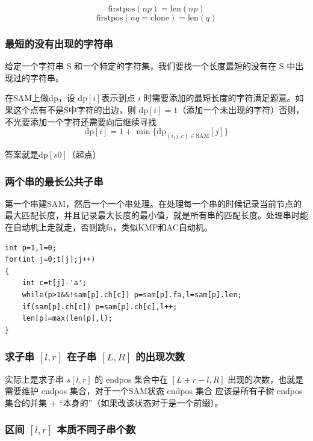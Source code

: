 $$
\text{firstpos}(np)=\text{len}(np)
$$
$$
\text{firstpos}(nq=\text{clone})=\text{len}(q)
$$
\subsubsection{最短的没有出现的字符串}

\begin{tcolorbox}
给定一个字符串 S 和一个特定的字符集，我们要找一个长度最短的没有在 S 中出现过的字符串。
\end{tcolorbox}

\par \noindent 在SAM上做dp，设 $\text{dp}[i]$表示到点 $i$ 时需要添加的最短长度的字符满足题意。如果这个点有不是S中字符的出边，则 $\text{dp}[i]=1$（添加一个未出现的字符）否则，不光要添加一个字符还需要向后继续寻找
$$
\text{dp}[i]=1+\min\{\text{dp}_{(i,j,c)\in\text{SAM}}[j]\}
$$

\par \noindent 答案就是$\text{dp}[s0]$（起点）

\subsubsection{两个串的最长公共子串}
\par \noindent 第一个串建SAM，然后一个一个串处理。在处理每一个串的时候记录当前节点的最大匹配长度，并且记录最大长度的最小值，就是所有串的匹配长度。处理串时能在自动机上走就走，否则跳fa，类似KMP和AC自动机。

\begin{verbatim}
int p=1,l=0;
for(int j=0;t[j];j++)
{
    int c=t[j]-'a';
    while(p>1&&!sam[p].ch[c]) p=sam[p].fa,l=sam[p].len;
    if(sam[p].ch[c]) p=sam[p].ch[c],l++;
    len[p]=max(len[p],l);
}
\end{verbatim}
\subsubsection{求子串 $[l, r]$ 在子串 $[L, R]$ 的出现次数}
\par \noindent 实际上是求子串 $s[l,r]$ 的 endpos 集合中在 $[L+r-l,R]$ 出现的次数，也就是需要维护 endpos 集合，对于一个SAM状态 endpos 集合 应该是所有子树 endpos 集合的并集 + “本身的”（如果改该状态对于是一个前缀）。
\subsubsection{区间 $[l, r]$ 本质不同子串个数}

